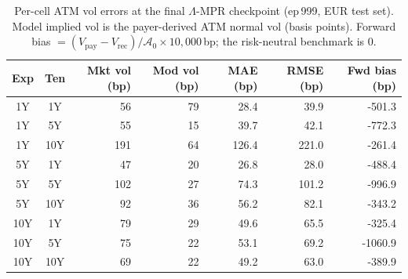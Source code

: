 \begin{table}[H]
\centering
\caption{Per-cell ATM vol errors at the final $\Lambda$-MPR checkpoint (ep\,999, EUR test set). Model implied vol is the payer-derived ATM normal vol (basis points). Forward bias $= (V_{\mathrm{pay}} - V_{\mathrm{rec}})/\mathcal{A}_0 \times 10{,}000$\,bp; the risk-neutral benchmark is $0$.}
\label{tab:lambda_per_cell_final}
\small
\begin{tabular}{@{}ccrrrrr@{}}
\toprule
\textbf{Exp} & \textbf{Ten} & \textbf{Mkt vol (bp)} & \textbf{Mod vol (bp)} & \textbf{MAE (bp)} & \textbf{RMSE (bp)} & \textbf{Fwd bias (bp)} \\
\midrule
  1Y & 1Y & 56 & 79 & 28.4 & 39.9 & -501.3 \\
  1Y & 5Y & 55 & 15 & 39.7 & 42.1 & -772.3 \\
  1Y & 10Y & 191 & 64 & 126.4 & 221.0 & -261.4 \\
  \midrule
  5Y & 1Y & 47 & 20 & 26.8 & 28.0 & -488.4 \\
  5Y & 5Y & 102 & 27 & 74.3 & 101.2 & -996.9 \\
  5Y & 10Y & 92 & 36 & 56.2 & 82.1 & -343.2 \\
  \midrule
  10Y & 1Y & 79 & 29 & 49.6 & 65.5 & -325.4 \\
  10Y & 5Y & 75 & 22 & 53.1 & 69.2 & -1060.9 \\
  10Y & 10Y & 69 & 22 & 49.2 & 63.0 & -389.9 \\
\bottomrule
\end{tabular}
\end{table}
